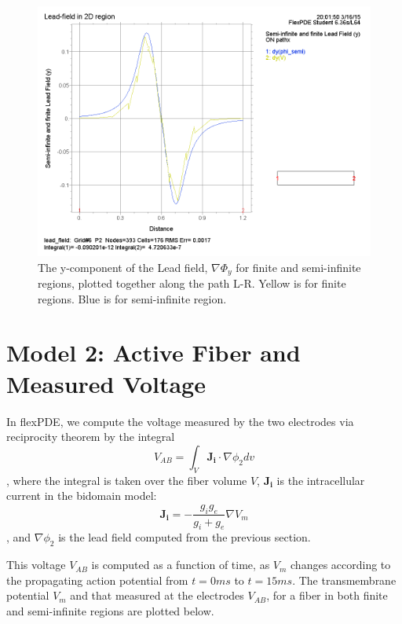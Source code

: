 \documentclass{article}
\begin{document}
\begin{figure}[H]
\begin{center}
        \includegraphics[scale=0.5]{lead_field_y.png}
        \caption{The y-component of the Lead field, $\nabla \Phi_y$ for finite and semi-infinite regions, plotted together along the path L-R. Yellow is for finite regions. Blue is for semi-infinite region.}
    \end{center}
\end{figure}

\section{Model 2: Active Fiber and Measured Voltage}
In flexPDE, we compute the voltage measured by the two electrodes via reciprocity theorem by the integral \[V_{AB} = \int_V \mathbf{J_i}\cdot\nabla\phi_2dv\], where the integral is taken over the fiber volume $V$, $\mathbf{J_i}$ is the intracellular current in the bidomain model: \[\mathbf{J_i} = -\frac{g_ig_e}{g_i+g_e}\nabla V_m\], and $\nabla\phi_2$ is the lead field computed from the previous section. 

This voltage $V_{AB}$ is computed as a function of time, as $V_m$ changes according to the propagating action potential from $t=0ms$ to $t=15ms$. The transmembrane potential $V_m$ and that measured at the electrodes $V_{AB}$, for a fiber in both finite and semi-infinite regions are plotted below.
\end{document}
